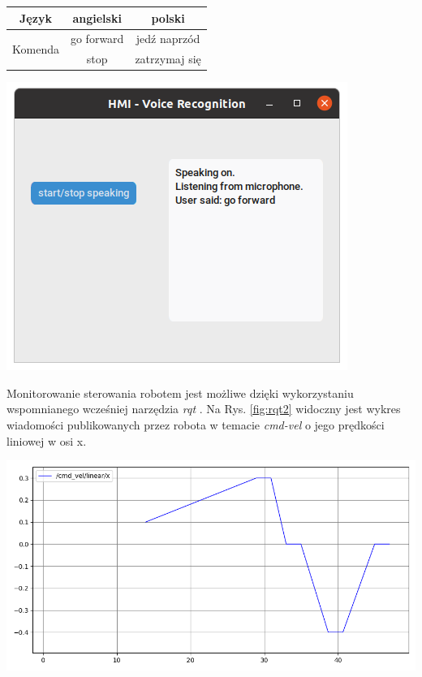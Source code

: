 \begin{center}
    \begin{tabular}{ |c|c|c| } 
    \hline
    Język & angielski & polski \\
    \hline
    \multirow{2}{4em}{Komenda} & go forward & jedź naprzód \\ 
    & stop & zatrzymaj się \\ 
    \hline
    \end{tabular}
    \label{tab:commands}
\end{center}

\begin{center}
    \includegraphics[width=0.8\linewidth]{files/panel_2.png}
    \label{fig:panel_2}
\end{center}

\break
Monitorowanie sterowania robotem jest możliwe dzięki wykorzystaniu wspomnianego wcześniej narzędzia \textit{rqt} \cite{rqt}. Na Rys. \ref{fig:rqt2} widoczny jest wykres wiadomości publikowanych przez robota w temacie \textit{cmd-vel} o jego prędkości liniowej w osi x.

\begin{center}
    \includegraphics[width=0.9\linewidth]{files/rqt2.png}
    \label{fig:rqt2}
\end{center}

